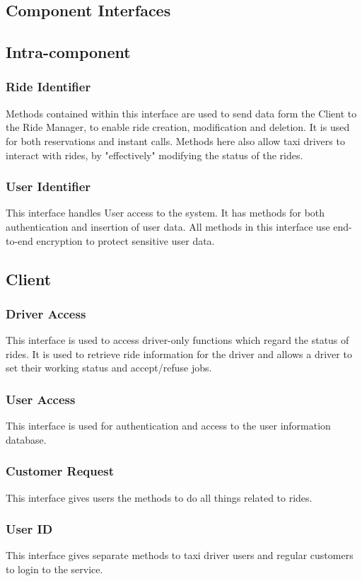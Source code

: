 \subsection{Component Interfaces}
	\subsection{Intra-component}
		\subsubsection{Ride Identifier}
			Methods contained within this interface are used to send data form the Client to the Ride Manager, to enable ride creation, modification and deletion. It is used for both
			reservations and instant calls. Methods here also allow taxi drivers to interact with rides, by "effectively" modifying the status of the rides.
		\subsubsection{User Identifier}
			This interface handles User access to the system. It has methods for both authentication and insertion of user data. All methods in this interface use end-to-end encryption
			to protect sensitive user data.
	\subsection{Client}
		\subsubsection{Driver Access}
			This interface is used to access driver-only functions which regard the status of rides. It is used to retrieve ride information for the driver and allows a driver to set their working
			status and accept/refuse jobs.
		\subsubsection{User Access}
			This interface is used for authentication and access to the user information database.
		\subsubsection{Customer Request}
			This interface gives users the methods to do all things related to rides.
		\subsubsection{User ID}
			This interface gives separate methods to taxi driver users and regular customers to login to the service.
